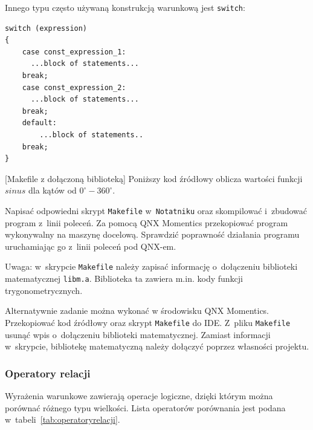 Innego typu często używaną konstrukcją warunkową jest \lstinline[style=MyCStyle]{switch}: 

\begin{lstlisting}[style=MyCStyle]
switch (expression)
{
	case const_expression_1:
      ...block of statements...
    break;
	case const_expression_2:
      ...block of statements...
    break;
	default:
	    ...block of statements..
    break;
}
\end{lstlisting}



\begin{example}{[Makefile z dołączoną biblioteką]}
Poniższy kod źródłowy oblicza wartości funkcji $sinus$ dla kątów od $0^{\circ}-360^{\circ}$. 





\begin{myenumerate}
\item Napisać odpowiedni skrypt \lstinline[style=MyCStyle]{Makefile} w~\lstinline[style=MyCStyle]{Notatniku} oraz skompilować i~zbudować program z~linii poleceń. Za pomocą QNX Momentics przekopiować program wykonywalny na maszynę docelową. Sprawdzić poprawność działania programu uruchamiając go z~linii poleceń pod QNX-em. 

Uwaga: w~skrypcie \lstinline[style=MyCStyle]{Makefile} należy zapisać informację o~dołączeniu biblioteki matematycznej \mbox{\lstinline[style=MyCStyle]{libm.a}}. Biblioteka ta zawiera m.in. kody funkcji trygonometrycznych. 
\item  Alternatywnie zadanie można wykonać w środowisku QNX Momentics. Przekopiować kod źródłowy oraz skrypt \lstinline[style=MyCStyle]{Makefile} do IDE. Z~pliku \lstinline[style=MyCStyle]{Makefile} usunąć wpis o~dołączeniu biblioteki matematycznej. Zamiast informacji w~skrypcie, bibliotekę matematyczną należy dołączyć poprzez własności projektu. 
\end{myenumerate} 

\end{example} 


\subsubsection{Operatory relacji}

Wyrażenia warunkowe zawierają operacje logiczne, dzięki którym można porównać różnego typu wielkości. Lista operatorów porównania jest podana w~tabeli~\ref{tab:operatoryrelacji}. 

